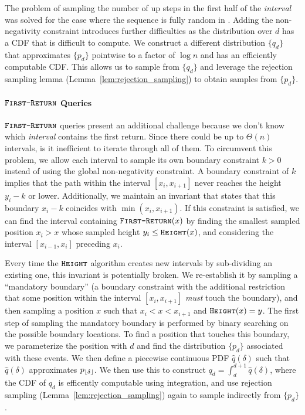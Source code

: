 The problem of sampling the number of up steps in the first half of the \emph{interval} was solved for the case where the sequence is fully random
in \cite{huge}.
Adding the non-negativity constraint introduces further difficulties as the distribution over $d$ has a CDF that is difficult to compute.
We construct a different distribution $\{q_d\}$ that approximates $\{p_d\}$ pointwise to a factor of $\log n$ and has an efficiently computable CDF.
This allows us to sample from $\{q_d\}$ and leverage the rejection sampling lemma (Lemma~\ref{lem:rejection_sampling}) to obtain samples from $\{p_d\}$.

\paragraph*{$\texttt{\textsc{First-Return}}$ Queries}
\label{par:_first-return_queries}
$\texttt{\textsc{First-Return}}$ queries present an additional challenge because we don't know which \emph{interval} contains the first return.
Since there could be up to $\Theta(n)$ intervals, is it inefficient to iterate through all of them.
To circumvent this problem, we allow each interval to sample its own boundary constraint $k>0$ instead of using the global non-negativity constraint.
A boundary constraint of $k$ implies that the path within the interval $[x_i,x_{i+1}]$ never reaches the height $y_i-k$ or lower.
Additionally, we maintain an invariant that states that this boundary $x_i-k$ coincides with $\min(x_i,x_{i+1})$.
If this constraint is satisfied, we can find the interval containing $\texttt{\textsc{First-Return}}(x)$ by finding the smallest sampled position $x_i>x$
whose sampled height $y_i \le \texttt{\textsc{Height}}(x)$, and considering the interval $[x_{i-1},x_i]$ preceding $x_i$.

Every time the $\texttt{\textsc{Height}}$ algorithm creates new intervals by sub-dividing an existing one, this invariant is potentially broken.
We re-establish it by sampling a ``mandatory boundary''
(a boundary constraint with the additional restriction that some position within the interval $[x_i,x_{i+1}]$ \emph{must} touch the boundary),
and then sampling a position $x$ such that $x_i < x < x_{i+1}$ and $\texttt{\textsc{Height}}(x) = y$.
The first step of sampling the mandatory boundary is performed by binary searching on the possible boundary locations.
To find a position that touches this boundary, we parameterize the position with $d$ and find the distribution $\{p_d\}$ associated with these events.
We then define a piecewise continuous PDF $\hat q(\delta)$ such that $\hat q(\delta)$ approximates $p_{\lfloor\delta\rfloor}$.
We then use this to construct $q_d = \int_d^{d+1}\hat q(\delta)$, where the CDF of $q_d$ is efficently computable using integration,
and use rejection sampling (Lemma~\ref{lem:rejection_sampling}) again to sample indirectly from $\{p_d\}$.
